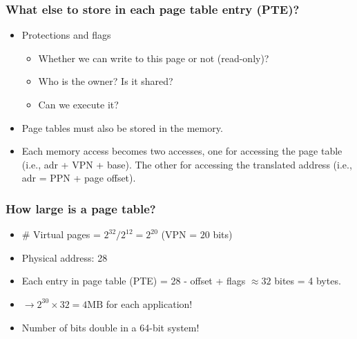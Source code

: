 \documentclass[10pt]{article}
\begin{document}
\subsubsection*{What else to store in each page table entry (PTE)?}
\begin{itemize}
    \item Protections and flags
    \begin{itemize}
        \item Whether we can write to this page or not (read-only)?
        \item Who is the owner?  Is it shared?
        \item Can we execute it?
    \end{itemize}
    \item Page tables must also be stored in the memory.
    \item Each memory access becomes two accesses, one for accessing the page table (i.e., adr + VPN + base).  The other for accessing the translated address (i.e., adr = PPN + page offset).
\end{itemize}
\subsubsection*{How large is a page table?}
\begin{itemize}
    \item \# Virtual pages = $2^{32} / 2^{12} = 2^{20}$  (VPN = $20$ bits)
    \item Physical address: 28
    \item Each entry in page table (PTE) = 28 - offset + flags $\approx 32$ bites = 4 bytes.
    \item $\rightarrow 2^{30} \times 32 = 4\text{MB}$ for each application!
    \item Number of bits double in a 64-bit system!
\end{itemize}
\end{document}
